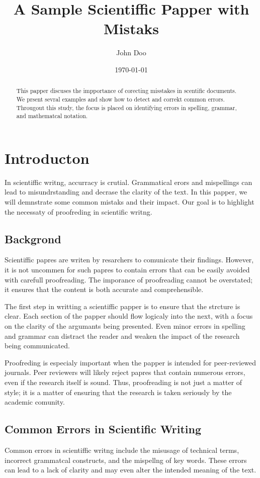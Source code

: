 \documentclass{article}
\title{A Sample Scientiffic Papper with Mistaks}
\author{John Doo}
\date{\today}
\begin{document}
\maketitle

\begin{abstract}
This papper discuses the impportance of corecting misstakes in scentific documents. We prsent sevral examples and show how to detect and correkt common errors. Througout this study, the focus is placed on identifying errors in spelling, grammar, and mathematcal notation.
\end{abstract}

\section{Introducton}
In scientiffic writng, accurracy is crutial. Grammatical erors and mispellings can lead to misundrstanding and decrase the clarity of the text. In this papper, we will demnstrate some common mistaks and their impact. Our goal is to highlight the necessaty of proofreding in scientific writng.

\subsection{Backgrond}
Scientiffic papres are writen by resarchers to comunicate their findings. However, it is not uncommen for such papres to contain errors that can be easily avoided with carefull proofreading. The imporance of proofreading cannot be overstated; it ensures that the content is both accurate and comprehensible.

The first step in writting a scientiffic papper is to ensure that the strcture is clear. Each section of the papper should flow logicaly into the next, with a focus on the clarity of the argumants being presented. Even minor errors in spelling and grammar can distract the reader and weaken the impact of the research being communicated.

Proofreding is especialy important when the papper is intended for peer-reviewed journals. Peer reviewers will likely reject papres that contain numerous errors, even if the research itself is sound. Thus, proofreading is not just a matter of style; it is a matter of ensuring that the research is taken seriously by the academic comunity.

\subsection{Common Errors in Scientific Writing}
Common errors in scientiffic writng include the misusage of technical terms, incorrect grammatcal constructs, and the mispellng of key words. These errors can lead to a lack of clarity and may even alter the intended meaning of the text.
\end{document}
